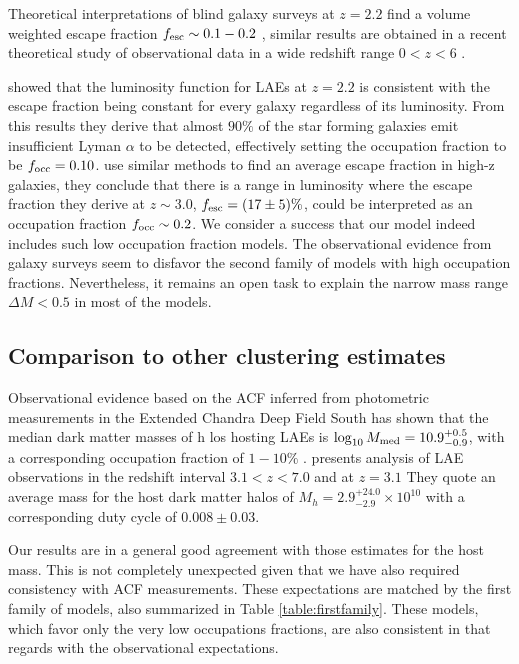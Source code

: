 \documentclass[usenatbib]{mn2e}
\newcommand{\ly}{{\ifmmode{{\rm Ly}\alpha}\else{Ly$\alpha$~}\fi}}
\newcommand{\hMsun}{{\ifmmode{h^{-1}{\rm
        {M_{\odot}}}}\else{$h^{-1}{\rm{M_{\odot}}}$}\fi}}
\newcommand{\Msun}{{\ifmmode{{\rm {M_{\odot}}}}\else{${\rm{M_{\odot}}}$}\fi}}
\begin{document}
Theoretical interpretations of blind galaxy surveys at $z=2.2$ find a
volume weighted escape fraction $f_{\rm esc}\sim 0.1-0.2$
\cite{Hayes2010}, similar results are obtained in a recent theoretical
study of observational data in a wide redshift range $0<z<6$
\citep{Dijkstra2013}. 


\cite{Hayes2010} showed that the luminosity function for
LAEs at $z=2.2$ is consistent with the escape fraction being constant
for every galaxy regardless of its luminosity. From this results they
derive that almost $90\%$ of the star forming galaxies emit insufficient
Lyman $\alpha$ to be detected, effectively setting the occupation
fraction to be $f_{\rm occ}=0.10$. \cite{Dijkstra2013} use similar
methods to find an average \ly escape fraction in high-z galaxies,
they conclude that there is a range in \ly luminosity where the escape
fraction they derive at $z\sim 3.0$, $f_{\rm esc}=(17\pm 5)\%$, could
be interpreted as an occupation fraction $f_{\rm occ}\sim 0.2$. We
consider a success that our model indeed includes such low occupation
fraction models. The observational evidence from galaxy surveys seem
to disfavor the second family of models with high occupation
fractions. Nevertheless, it remains an open task to explain the narrow
mass range $\Delta M<0.5$ in most of the models. 


\subsection{Comparison to other clustering estimates}

Observational evidence based on the ACF inferred from photometric
measurements in the Extended Chandra Deep Field South has shown that
the median dark matter masses of h los hosting LAEs is
$\log_{10}M_{\rm  med}=10.9^{+0.5}_{-0.9}$\Msun, with a corresponding
occupation fraction of $1-10\%$  \citep{Gawiser07}.  \cite{Ouchi2010}
presents analysis of LAE observations in the redshift interval
$3.1<z<7.0$ and at $z=3.1$ They quote an average mass for the host
dark matter halos of $M_{h}=2.9^{+24.0}_{-2.9}\times 10^{10}$ \hMsun
with a corresponding duty cycle of $0.008\pm 0.03$.  

Our results are in a general good agreement with those estimates for
the host mass. This is not completely unexpected given that we have
also required consistency with ACF measurements. These expectations
are matched by the first family of models, also summarized in Table
\ref{table:firstfamily}. These models, which favor only the very
low occupations fractions, are also consistent in that regards with
the observational expectations.
\end{document}
